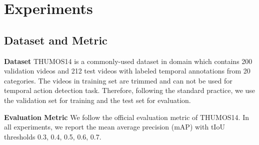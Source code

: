 \documentclass[final]{cvpr}
\begin{document}
\section{Experiments}
\subsection{Dataset and Metric}
\textbf{Dataset}
THUMOS14 \cite{jiang2014thumos} is a commonly-used dataset in domain which contains 200 validation videos and 212 test videos with labeled temporal annotations from 20 categories. The videos in training set are trimmed and can not be used for temporal action detection task. Therefore, following the standard practice, we use the validation set for training and the test set for evaluation. 

\textbf{Evaluation Metric}
We follow the official evaluation metric of THUMOS14. In all experiments, we report the mean average precision (mAP) with tIoU thresholds 0.3, 0.4, 0.5, 0.6, 0.7.
\end{document}
